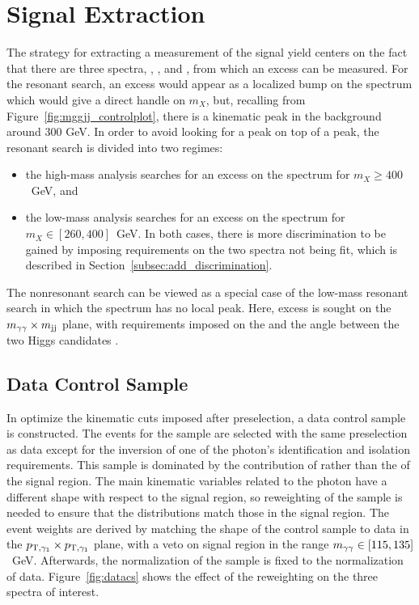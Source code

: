 \section{Signal Extraction\label{sec:extraction}}

The strategy for extracting a measurement of the signal yield centers on the fact that there
are three spectra, \Mgg, \Mjj, and \Mggjjk, from which an excess can be measured.
For the resonant search, an excess would appear as a localized bump on the
\Mggjjk spectrum which would give a direct handle on $m_X$,
but, recalling from Figure~\ref{fig:mggjj_controlplot}, there is a kinematic peak in the background
around 300 GeV. In order to avoid looking for a peak on top of a peak, the resonant search is
divided into two regimes:
\begin{itemize}
\item the high-mass analysis searches for an excess on the \Mggjjk spectrum for $m_X \ge 400$~GeV, and
\item the low-mass analysis searches for an excess on the \Mgg spectrum for $m_X \in [260, 400]$~GeV.
In both cases, there is more discrimination to be gained by imposing requirements on the two spectra
not being fit, which is described in Section~\ref{subsec:add_discrimination}.
\end{itemize}

The nonresonant search can be viewed as a special case of the low-mass resonant search in which
the \Mggjjk spectrum has no local peak. Here, excess is sought on the $m_{\gamma\gamma} \times m_{\rm jj}$ plane,
with requirements imposed on the \Mggjj and the angle between the two Higgs candidates
\acosthetastar.

\subsection{Data Control Sample\label{subsec:dataCS}}

In optimize the kinematic cuts imposed after preselection, a data control sample is constructed.
The events for the sample are selected with the same preselection as data except for
the inversion of one of the photon's identification and isolation requirements. This sample
is dominated by the contribution of \gjjj rather than the \ggjj of the signal region.
The main kinematic variables related to the photon have a different shape with respect to the
signal region, so reweighting of the sample is needed to ensure that the distributions
match those in the signal region. The event weights are derived by matching the shape
of the control sample to data in the $p_{{\rm T},\gamma_1} \times p_{{\rm T},\gamma_1}$ plane,
with a veto on signal region in the range $m_{\gamma\gamma} \in [115, 135]$~GeV. Afterwards,
the normalization of the sample is fixed to the normalization of data. Figure~\ref{fig:datacs}
shows the effect of the reweighting on the three spectra of interest.

